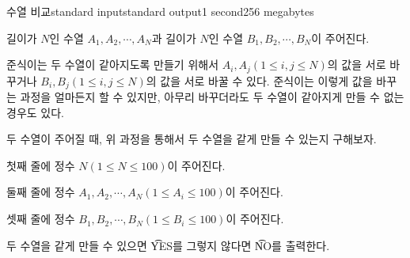 \begin{problem}{수열 비교}{standard input}{standard output}{1 second}{256 megabytes}

길이가 $N$인 수열 $A_1, A_2, \cdots, A_N$과 길이가 $N$인 수열 $B_1, B_2, \cdots, B_N$이 주어진다.

준식이는 두 수열이 같아지도록 만들기 위해서 $A_i, A_j (1 \leq i, j \leq N)$의 값을 서로 바꾸거나 $B_i, B_j (1 \leq i, j \leq N)$의 값을 서로 바꿀 수 있다. 준식이는 이렇게 값을 바꾸는 과정을 얼마든지 할 수 있지만, 아무리 바꾸더라도 두 수열이 같아지게 만들 수 없는 경우도 있다.

두 수열이 주어질 때, 위 과정을 통해서 두 수열을 같게 만들 수 있는지 구해보자.

\InputFile
첫째 줄에 정수 $N(1 \leq N \leq 100)$이 주어진다.

둘째 줄에 정수 $A_1, A_2, \cdots, A_N(1 \leq A_i \leq 100)$이 주어진다.

셋째 줄에 정수 $B_1, B_2, \cdots, B_N(1 \leq B_i \leq 100)$이 주어진다.

\OutputFile
두 수열을 같게 만들 수 있으면 \t{YES}를 그렇지 않다면 \t{NO}를 출력한다.

\Examples

\begin{example}
%
%
\end{example}

\end{problem}
